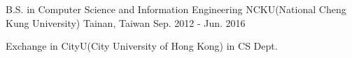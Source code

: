 

\begin{cventries}

  \cventry
    {B.S. in Computer Science and Information Engineering} %
    {NCKU(National Cheng Kung University)} %
    {Tainan, Taiwan} %
    {Sep. 2012 - Jun. 2016} %
    {
      \begin{cvitems} %
        \item {Exchange in CityU(City University of Hong Kong) in CS Dept.}
      \end{cvitems}
    }

\end{cventries}
